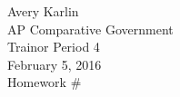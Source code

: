 \documentclass[12pt]{article}
\title{\Title}
\date{\Date}
\author{\Author}
\newcommand{\publisher}{Trainor Period 4}
\newcommand{\class}{AP Comparative Government}
\newcommand{\Title}{Homework \#}
\newcommand{\Author}{Avery Karlin}
\newcommand{\Date}{February 5, 2016}
\begin{document}
\begin{flushleft}
\Author \\
\class \\
\publisher \\
\Date \\
\Title \\
\end{flushleft}

\end{document}

